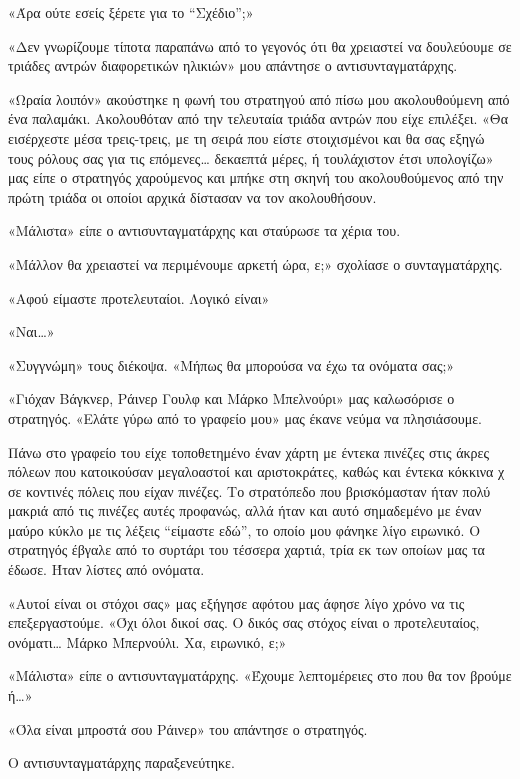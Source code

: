 \documentclass[12pt,twoside, openany]{book}
\begin{document}
«Άρα ούτε εσείς ξέρετε για το “Σχέδιο”;»

«Δεν γνωρίζουμε τίποτα παραπάνω από το γεγονός ότι θα χρειαστεί να δουλεύουμε σε τριάδες αντρών διαφορετικών ηλικιών» μου απάντησε ο αντισυνταγματάρχης.

«Ωραία λοιπόν» ακούστηκε η φωνή του στρατηγού από πίσω μου ακολουθούμενη από ένα παλαμάκι. Ακολουθόταν από την τελευταία τριάδα αντρών που είχε επιλέξει. «Θα εισέρχεστε μέσα τρεις-τρεις, με τη σειρά που είστε στοιχισμένοι και θα σας εξηγώ τους ρόλους σας για τις επόμενες… δεκαεπτά μέρες, ή τουλάχιστον έτσι υπολογίζω» μας είπε ο στρατηγός χαρούμενος και μπήκε στη σκηνή του ακολουθούμενος από την πρώτη τριάδα οι οποίοι αρχικά δίστασαν να τον ακολουθήσουν. 

«Μάλιστα» είπε ο αντισυνταγματάρχης και σταύρωσε τα χέρια του.

«Μάλλον θα χρειαστεί να περιμένουμε αρκετή ώρα, ε;» σχολίασε ο συνταγματάρχης.

«Αφού είμαστε προτελευταίοι. Λογικό είναι»

«Ναι…»

«Συγγνώμη» τους διέκοψα. «Μήπως θα μπορούσα να έχω τα ονόματα σας;»\newline\newline

«Γιόχαν Βάγκνερ, Ράινερ Γουλφ και Μάρκο Μπελνούρι» μας καλωσόρισε ο στρατηγός. «Ελάτε γύρω από το γραφείο μου» μας έκανε νεύμα να πλησιάσουμε.

Πάνω στο γραφείο του είχε τοποθετημένο έναν χάρτη με έντεκα πινέζες στις άκρες πόλεων που κατοικούσαν μεγαλοαστοί και αριστοκράτες, καθώς και έντεκα κόκκινα χ σε κοντινές πόλεις που είχαν πινέζες. Το στρατόπεδο που βρισκόμασταν ήταν πολύ μακριά από τις πινέζες αυτές προφανώς, αλλά ήταν και αυτό σημαδεμένο με έναν μαύρο κύκλο με τις λέξεις “είμαστε εδώ”, το οποίο μου φάνηκε λίγο ειρωνικό. Ο στρατηγός έβγαλε από το συρτάρι του τέσσερα χαρτιά, τρία εκ των οποίων μας τα έδωσε. Ήταν λίστες από ονόματα.

«Αυτοί είναι οι στόχοι σας» μας εξήγησε αφότου μας άφησε λίγο χρόνο να τις επεξεργαστούμε. «Όχι όλοι δικοί σας. Ο δικός σας στόχος είναι ο προτελευταίος, ονόματι… Μάρκο Μπερνούλι. Χα, ειρωνικό, ε;»

«Μάλιστα» είπε ο αντισυνταγματάρχης. «Έχουμε λεπτομέρειες στο που θα τον βρούμε ή…»

«Όλα είναι μπροστά σου Ράινερ» του απάντησε ο στρατηγός.

Ο αντισυνταγματάρχης παραξενεύτηκε.
\end{document}
